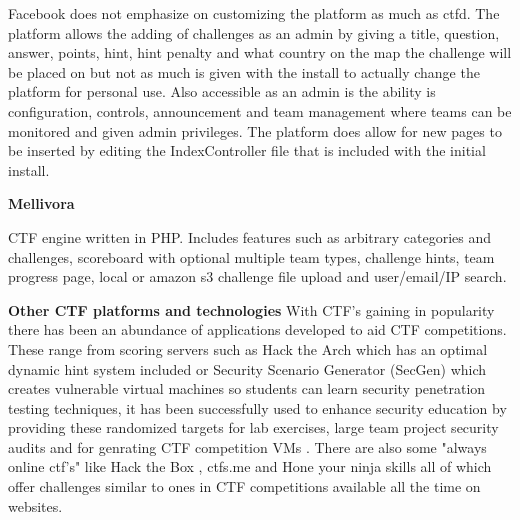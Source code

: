\documentclass[12pt,a4paper]{article}
\begin{document}
Facebook does not emphasize on customizing the platform as much as ctfd. The platform allows the adding of challenges as an admin by giving a title, question, answer, points, hint, hint penalty and what country on the map the challenge will be placed on but not as much is given with the install to actually change the platform for personal use. Also accessible as an admin is the ability is configuration, controls, announcement and team management where teams can be monitored and given admin privileges. The platform does allow for new pages to be inserted by editing the IndexController file that is included with the initial install. 

\textbf{Mellivora} 

CTF engine written in PHP. Includes features such as arbitrary categories and challenges, scoreboard with optional multiple team types, challenge hints, team progress page, local or amazon s3 challenge file upload and user/email/IP search\cite{mellivora}.  

\textbf{Other CTF platforms and technologies}  
With CTF's gaining in popularity there has been an abundance of applications developed to aid CTF competitions. These range from scoring servers such as Hack the Arch \cite{HackTheArch} which has an optimal dynamic hint system included or Security Scenario Generator (SecGen)\cite{SecGen} which creates vulnerable virtual machines so students can learn security penetration testing techniques, it has been successfully used to enhance security education by providing these randomized targets for lab exercises, large team project security audits and for genrating CTF competition VMs \cite{schreuders2017security}. There are also some "always online ctf's" like Hack the Box \cite{HackTheBox}, ctfs.me \cite{ctfs} and Hone your ninja skills \cite{Ninja} all of which offer challenges similar to ones in CTF competitions available all the time on websites. 
\end{document}
